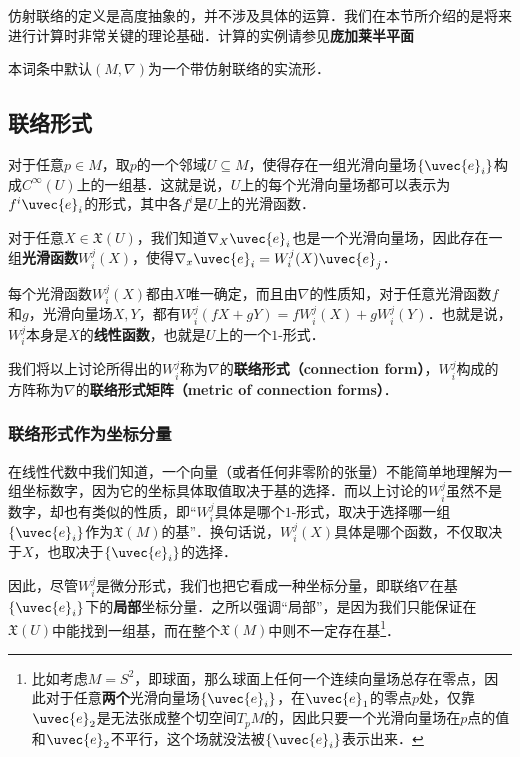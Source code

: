 

仿射联络的定义是高度抽象的，并不涉及具体的运算．我们在本节所介绍的是将来进行计算时非常关键的理论基础．计算的实例请参见\textbf{庞加莱半平面}

本词条中默认$(M, \nabla)$为一个带仿射联络的实流形．

\subsection{联络形式}

对于任意$p\in M$，取$p$的一个邻域$U\subseteq M$，使得存在一组光滑向量场$\{\uvec{e}_i\}$构成$C^{\infty}(U)$上的一组基．这就是说，$U$上的每个光滑向量场都可以表示为$f^i\uvec{e}_i$的形式，其中各$f^i$是$U$上的光滑函数．

对于任意$X\in\mathfrak{X}(U)$，我们知道$\nabla_X\uvec{e}_i$也是一个光滑向量场，因此存在一组\textbf{光滑函数}$W^j_i(X)$，使得$\nabla_x\uvec{e}_i=W^j_i(X)\uvec{e}_j$．

每个光滑函数$W^j_i(X)$都由$X$唯一确定，而且由$\nabla$的性质知，对于任意光滑函数$f$和$g$，光滑向量场$X, Y$，都有$W^j_i(fX+gY)=fW^j_i(X)+gW^j_i(Y)$．也就是说，$W^j_i$本身是$X$的\textbf{线性函数}，也就是$U$上的一个$1$-形式．

我们将以上讨论所得出的$W^j_i$称为$\nabla$的\textbf{联络形式（connection form）}，$W^j_i$构成的方阵称为$\nabla$的\textbf{联络形式矩阵（metric of connection forms）}．

\subsubsection{联络形式作为坐标分量}

在线性代数中我们知道，一个向量（或者任何非零阶的张量）不能简单地理解为一组坐标数字，因为它的坐标具体取值取决于基的选择．而以上讨论的$W^j_i$虽然不是数字，却也有类似的性质，即“$W^j_i$具体是哪个$1$-形式，取决于选择哪一组$\{\uvec{e}_i\}$作为$\mathfrak{X}(M)$的基”．换句话说，$W^j_i(X)$具体是哪个函数，不仅取决于$X$，也取决于$\{\uvec{e}_i\}$的选择．

因此，尽管$W_i^j$是微分形式，我们也把它看成一种坐标分量，即联络$\nabla$在基$\{\uvec{e}_i\}$下的\textbf{局部}坐标分量．之所以强调“局部”，是因为我们只能保证在$\mathfrak{X}(U)$中能找到一组基，而在整个$\mathfrak{X}(M)$中则不一定存在基\footnote{比如考虑$M=S^2$，即球面，那么球面上任何一个连续向量场总存在零点，因此对于任意\textbf{两个}光滑向量场$\{\uvec{e}_i\}$，在$\uvec{e}_1$的零点$p$处，仅靠$\uvec{e}_2$是无法张成整个切空间$T_pM$的，因此只要一个光滑向量场在$p$点的值和$\uvec{e}_2$不平行，这个场就没法被$\{\uvec{e}_i\}$表示出来．}．

